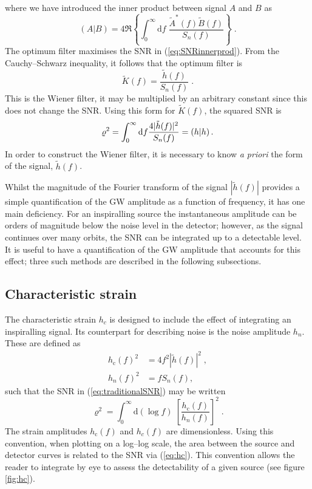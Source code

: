 where we have introduced the inner product between signal $A$ and $B$ as \citep{Finn1992}
\begin{equation}\label{eq:snrinnerprod} \left( A | B \right) = 4\Re\left\{\int_{0}^{\infty}\mathrm{d}f\;\frac{\tilde{A}^{*}(f)\tilde{B}(f)}{S_{n}(f)}\right\} \; .\end{equation}
The optimum filter maximises the SNR in (\ref{eq:SNRinnerprod}). From the Cauchy--Schwarz inequality, it follows that the optimum filter is
\begin{equation}
\tilde{K}(f)=\frac{\tilde{h}(f)}{S_{n}(f)} \; .
\end{equation}
This is the Wiener filter, it may be multiplied by an arbitrary constant since this does not change the SNR. Using this form for $\tilde{K}(f)$, the squared SNR is
\begin{equation}
\varrho^2 = \int_0^\infty\mathrm{d}f \frac{4| \tilde{h}(f)|^{2}}{S_n(f)} = \left({h}\middle|{h}\right).
\label{eq:traditionalSNR} 
\end{equation}
In order to construct the Wiener filter, it is necessary to know \emph{a priori} the form of the signal, $\tilde{h}(f)$.

Whilst the magnitude of the Fourier transform of the signal $|\tilde{h}(f)|$ provides a simple quantification of the GW amplitude as a function of frequency, it has one main deficiency. For an inspiralling source the instantaneous amplitude can be orders of magnitude below the noise level in the detector; however, as the signal continues over many orbits, the SNR can be integrated up to a detectable level. It is useful to have a quantification of the GW amplitude that accounts for this effect; three such methods are described in the following subsections.

\subsection{Characteristic strain}

The characteristic strain $h_c$ is designed to include the effect of integrating an inspiralling signal. Its counterpart for describing noise is the noise amplitude $h_n$. These are defined as
\begin{eqnarray}\label{eq:strain-hc} 
h_\mathrm{c}(f)^{2} &= 4f^{2}\left| \tilde{h}(f) \right|^{2} \; ,\\
h_{n}(f)^{2} &= fS_{n}(f),
\label{eq:strain-hn}
\end{eqnarray}
such that the SNR in (\ref{eq:traditionalSNR}) may be written
\begin{equation}\label{eq:hc} 
\varrho^{2} = \int_{0}^{\infty} \mathrm{d}\left(\log f\right)\; \left[\frac{h_\mathrm{c}(f)}{h_{n}(f)}\right]^{2} \;.
\end{equation}
The strain amplitudes $h_\mathrm{c}(f)$ and $h_{c}(f)$ are dimensionless. Using this convention, when plotting on a log--log scale, the area between the source and detector curves is related to the SNR via (\ref{eq:hc}). This convention allows the reader to integrate by eye to assess the detectability of a given source (see figure \ref{fig:hc}).

